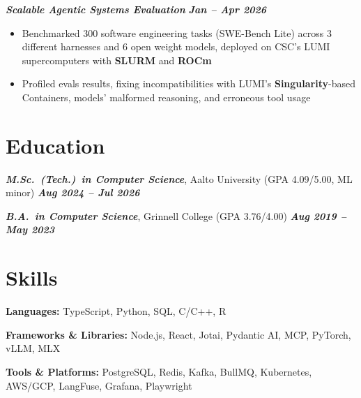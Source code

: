 \documentclass[11pt,a4paper]{article}
\newcommand{\projectheader}[2]{%
    \Needspace{7\baselineskip}%
    \noindent\textbf{\textit{#1}} \hfill \textbf{\textit{#2}}%
}
\begin{document}
\projectheader{Scalable Agentic Systems Evaluation}{Jan -- Apr 2026}
\begin{itemize}
    \item Benchmarked 300 software engineering tasks (SWE-Bench Lite) across 3 different harnesses and 6 open weight models, deployed on CSC's LUMI supercomputers with \textbf{SLURM} and \textbf{ROCm}
    \item Profiled evals results, fixing incompatibilities with LUMI's \textbf{Singularity}-based Containers, models' malformed reasoning, and erroneous tool usage
\end{itemize}

\section{Education}

\noindent\textbf{\textit{M.Sc.\ (Tech.)\ in Computer Science}}, Aalto University (GPA 4.09/5.00, ML minor) \hfill \textbf{\textit{Aug 2024 -- Jul 2026}}

\vspace{3pt}

\noindent\textbf{\textit{B.A.\ in Computer Science}}, Grinnell College (GPA 3.76/4.00) \hfill \textbf{\textit{Aug 2019 -- May 2023}}

\section{Skills}

\noindent\textbf{Languages:} TypeScript, Python, SQL, C/C++, R

\noindent\textbf{Frameworks \& Libraries:} Node.js, React, Jotai, Pydantic AI, MCP, PyTorch, vLLM, MLX

\noindent\textbf{Tools \& Platforms:} PostgreSQL, Redis, Kafka, BullMQ, Kubernetes, AWS/GCP, LangFuse, Grafana, \mbox{Playwright}
\end{document}
